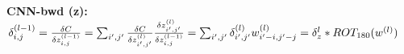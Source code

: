 \textbf{CNN-bwd (z):} $\delta_{i,j}^{(l-1)} 
= \frac{\delta C}{\delta z_{i,j}^{(l-1)}} 
= \sum_{i', j'} \frac{\delta C}{\delta z_{i',j'}^{(l)}} \frac{\delta z_{i',j'}^{(l)}}{\delta z_{i,j}^{(l-1)}} \\
= \sum_{i', j'} \delta_{i',j'}^{(l)} w_{i'-i,j'-j}^{(l)}
= \delta_z^{l} * ROT_{180}(w^{(l)})$\\

